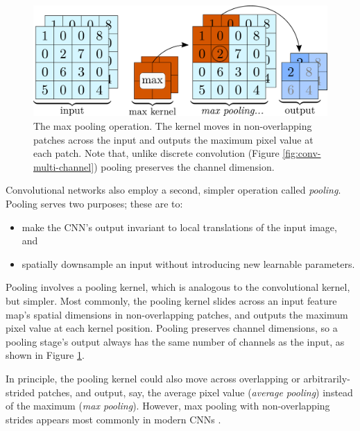 \documentclass[11pt, a4paper]{article}
\DeclarePairedDelimiter\floor{\lfloor}{\rfloor}  %
\begin{document}
\begin{figure}[htb!]
    \centering
    \includegraphics[width=0.8\linewidth]{vector/pooling.pdf}
    \vspace{-2mm}
    \caption{The max pooling operation.
    The kernel moves in non-overlapping patches across the input and outputs the maximum pixel value at each patch.
    Note that, unlike discrete convolution (Figure \ref{fig:conv-multi-channel}) pooling preserves the channel dimension.}
    \label{fig:pooling}
\end{figure}
Convolutional networks also employ a second, simpler operation called \textit{pooling}.
Pooling serves two purposes; these are to:
\begin{itemize}

    \item make the CNN's output invariant to local translations of the input image, and

    \item spatially downsample an input without introducing new learnable parameters.

\end{itemize}
Pooling involves a pooling kernel, which is analogous to the convolutional kernel, but simpler.
Most commonly, the pooling kernel slides across an input feature map's spatial dimensions in non-overlapping patches, and outputs the maximum pixel value at each kernel position.
Pooling preserves channel dimensions, so a pooling stage's output always has the same number of channels as the input, as shown in Figure \ref{fig:pooling}.

In principle, the pooling kernel could also move across overlapping or arbitrarily-strided patches, and output, say, the average pixel value (\textit{average pooling}) instead of the maximum (\textit{max pooling}).
However, max pooling with non-overlapping strides appears most commonly in modern CNNs \cite{homl}.


\end{document}
